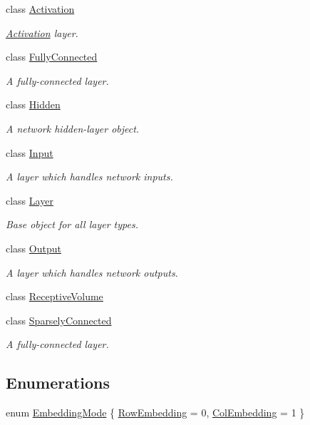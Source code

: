 \begin{DoxyCompactItemize}
\item 
class \hyperlink{classffnn_1_1layer_1_1_activation}{Activation}
\begin{DoxyCompactList}\small\item\em \hyperlink{classffnn_1_1layer_1_1_activation}{Activation} layer. \end{DoxyCompactList}\item 
class \hyperlink{classffnn_1_1layer_1_1_fully_connected}{Fully\-Connected}
\begin{DoxyCompactList}\small\item\em A fully-\/connected layer. \end{DoxyCompactList}\item 
class \hyperlink{classffnn_1_1layer_1_1_hidden}{Hidden}
\begin{DoxyCompactList}\small\item\em A network hidden-\/layer object. \end{DoxyCompactList}\item 
class \hyperlink{classffnn_1_1layer_1_1_input}{Input}
\begin{DoxyCompactList}\small\item\em A layer which handles network inputs. \end{DoxyCompactList}\item 
class \hyperlink{classffnn_1_1layer_1_1_layer}{Layer}
\begin{DoxyCompactList}\small\item\em Base object for all layer types. \end{DoxyCompactList}\item 
class \hyperlink{classffnn_1_1layer_1_1_output}{Output}
\begin{DoxyCompactList}\small\item\em A layer which handles network outputs. \end{DoxyCompactList}\item 
class \hyperlink{classffnn_1_1layer_1_1_receptive_volume}{Receptive\-Volume}
\item 
class \hyperlink{classffnn_1_1layer_1_1_sparsely_connected}{Sparsely\-Connected}
\begin{DoxyCompactList}\small\item\em A fully-\/connected layer. \end{DoxyCompactList}\end{DoxyCompactItemize}
\subsection*{Enumerations}
\begin{DoxyCompactItemize}
\item 
enum \hyperlink{namespaceffnn_1_1layer_a254f16beba4fb335d935e9b43bb9e69a}{Embedding\-Mode} \{ \hyperlink{namespaceffnn_1_1layer_a254f16beba4fb335d935e9b43bb9e69aa91eb0d1f175a08e2b2991cae348c827d}{Row\-Embedding} = 0, 
\hyperlink{namespaceffnn_1_1layer_a254f16beba4fb335d935e9b43bb9e69aa42ac01b35d45fd60256ef5008c96c049}{Col\-Embedding} = 1
 \}
\end{DoxyCompactItemize}
